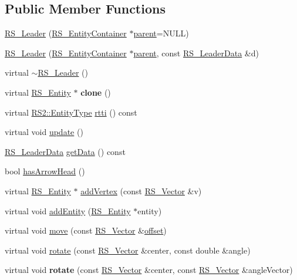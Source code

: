 \subsection*{Public Member Functions}
\begin{DoxyCompactItemize}
\item 
\hyperlink{classRS__Leader_a3ba08fd4038433e26a0fe6342875a3d3}{R\-S\-\_\-\-Leader} (\hyperlink{classRS__EntityContainer}{R\-S\-\_\-\-Entity\-Container} $\ast$\hyperlink{classRS__Entity_a80358a8d2fc6739a516a278dc500b49f}{parent}=N\-U\-L\-L)
\item 
\hyperlink{classRS__Leader_a88a9689cd67d912993b62c5164b4d231}{R\-S\-\_\-\-Leader} (\hyperlink{classRS__EntityContainer}{R\-S\-\_\-\-Entity\-Container} $\ast$\hyperlink{classRS__Entity_a80358a8d2fc6739a516a278dc500b49f}{parent}, const \hyperlink{classRS__LeaderData}{R\-S\-\_\-\-Leader\-Data} \&d)
\item 
virtual \hyperlink{classRS__Leader_ae69f1c5e0eff4acba32259569f9b21f6}{$\sim$\-R\-S\-\_\-\-Leader} ()
\item 
\hypertarget{classRS__Leader_a969a9b323cbc8e1528c512d37c119966}{virtual \hyperlink{classRS__Entity}{R\-S\-\_\-\-Entity} $\ast$ {\bfseries clone} ()}\label{classRS__Leader_a969a9b323cbc8e1528c512d37c119966}

\item 
virtual \hyperlink{classRS2_a8f26d1b981e1e85cff16738b43337e6a}{R\-S2\-::\-Entity\-Type} \hyperlink{classRS__Leader_afed987db1325a174134da216d43ebf4e}{rtti} () const 
\item 
virtual void \hyperlink{classRS__Leader_af36d6d9f88125406228d819651490d17}{update} ()
\item 
\hyperlink{classRS__LeaderData}{R\-S\-\_\-\-Leader\-Data} \hyperlink{classRS__Leader_ae0bffe0a1a7fb5a3da8b285adf57d07e}{get\-Data} () const 
\item 
bool \hyperlink{classRS__Leader_a728ecfb53ffef34638067f4e8e4cb834}{has\-Arrow\-Head} ()
\item 
virtual \hyperlink{classRS__Entity}{R\-S\-\_\-\-Entity} $\ast$ \hyperlink{classRS__Leader_a6cd58a7ebeb4b184d08d2a4cb35b129a}{add\-Vertex} (const \hyperlink{classRS__Vector}{R\-S\-\_\-\-Vector} \&v)
\item 
virtual void \hyperlink{classRS__Leader_a3132eb75973a3069e71b76f258643b46}{add\-Entity} (\hyperlink{classRS__Entity}{R\-S\-\_\-\-Entity} $\ast$entity)
\item 
virtual void \hyperlink{classRS__Leader_a76dcebae8efd9f608dd9a6d57a58defb}{move} (const \hyperlink{classRS__Vector}{R\-S\-\_\-\-Vector} \&\hyperlink{classRS__Entity_aa296d21b9aac99161d386ce2f60f0fea}{offset})
\item 
virtual void \hyperlink{classRS__Leader_a636de61cb287a32f55c4311bc69f6d5f}{rotate} (const \hyperlink{classRS__Vector}{R\-S\-\_\-\-Vector} \&center, const double \&angle)
\item 
\hypertarget{classRS__Leader_aa4c6c2ccedeb1ff8298f4aec50d03513}{virtual void {\bfseries rotate} (const \hyperlink{classRS__Vector}{R\-S\-\_\-\-Vector} \&center, const \hyperlink{classRS__Vector}{R\-S\-\_\-\-Vector} \&angle\-Vector)}\label{classRS__Leader_aa4c6c2ccedeb1ff8298f4aec50d03513}


\end{DoxyCompactItemize}
